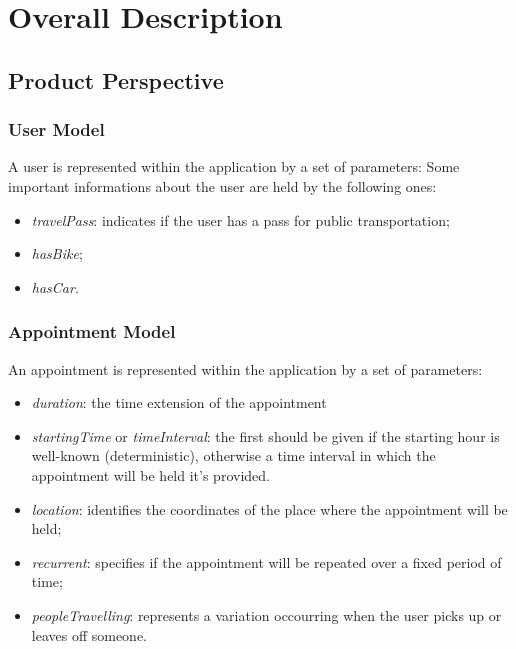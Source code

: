 \chapter{Overall Description}

\section{Product Perspective}

\subsection{User Model}
A user is represented within the application by a set of parameters:
Some important informations about the user are held by the following ones:
\begin{itemize}
\item \textit{travelPass}: indicates if the user has a pass for public transportation;
\item \textit{hasBike};
\item \textit{hasCar}.
\end{itemize}

\subsection{Appointment Model}
An appointment is represented within the application by a set of parameters:
\begin{itemize}
\item \textit{duration}: the time extension of the appointment
\item \textit{startingTime} or \textit{timeInterval}: the first should be given if the starting hour is well-known (deterministic), otherwise a time interval in which the appointment will be held it's provided. 
\item \textit{location}: identifies the coordinates of the place where the appointment will be held;
\item \textit{recurrent}: specifies if the appointment will be repeated over a fixed period of time;
\item \textit{peopleTravelling}: represents a variation occourring when the user picks up or leaves off someone.
\end{itemize}

